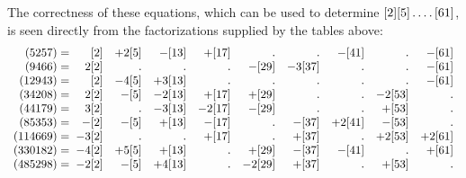 \par The correctness of these equations, which can be used to determine $[2][5]\mathinner{.\,.\,.\,.}[61]$, is seen directly from the factorizations supplied by the tables above:
\begingroup\fontsize{10}{13}\selectfont\setlength{\arraycolsep}{1.3pt}
\[
\begin{array}{r@{\;}rrrrrrrrr}
(5257)={} & [2] & +2[5] & -[13] & +[17] & \pdot & \pdot & -[41] & \pdot & -[61] \\
(9466)={} & 2[2] & \pdot & \pdot & \pdot & -[29] & -3[37] & \pdot & \pdot & -[61] \\
(12943)={} & [2] & -4[5] & +3[13] & \pdot & \pdot & \pdot & \pdot & \pdot & -[61] \\
(34208)={} & 2[2] & -[5] & -2[13] & +[17] & +[29] & \pdot & \pdot & -2[53] & \pdot \\
(44179)={} & 3[2] & \pdot & -3[13] & -2[17] & -[29] & \pdot & \pdot & +[53] & \pdot \\
(85353)={} & -[2] & -[5] & +[13] & -[17] & \pdot & -[37] & +2[41] & -[53] & \pdot \\
(114669)={} & -3[2] & \pdot & \pdot & +[17] & \pdot & +[37] & \pdot & +2[53] & +2[61] \\
(330182)={} & -4[2] & +5[5] & +[13] & \pdot & +[29] & -[37] & -[41] & \pdot & +[61] \\
(485298)={} & -2[2] & -[5] & +4[13] & \pdot & -2[29] & +[37] & \pdot & +[53] & \pdot \\
\end{array}
\]
\endgroup
